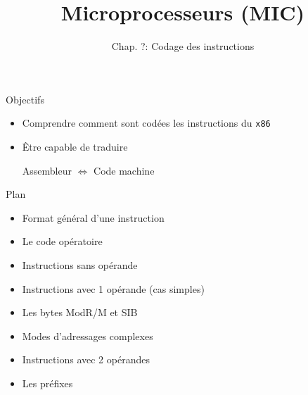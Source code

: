 \documentclass[14pt,xcolor,table]{beamer}
\title{Microprocesseurs (MIC)}
\subtitle{Chap. ?: Codage des instructions}
\date{}
\begin{document}
\begin{frame}
	\titlepage
\end{frame}

\begin{frame}[fragile]{Objectifs}
	
	\begin{itemize}
	\item 
		Comprendre comment sont codées les instructions du \verb_x86_
		\bigskip
	\item 
		Être capable de traduire 
		\begin{center}
			Assembleur $\Longleftrightarrow$ Code machine
		\end{center}
	\end{itemize}
	
\end{frame}

\begin{frame}[fragile]{Plan}

	\begin{itemize}
	\item Format général d'une instruction
	\item Le code opératoire
	\item Instructions sans opérande
	\item Instructions avec 1 opérande (cas simples)
	\item Les bytes ModR/M et SIB
	\item Modes d'adressages complexes
	\item Instructions avec 2 opérandes
	\item Les préfixes
	\end{itemize}

\end{frame}
\end{document}
